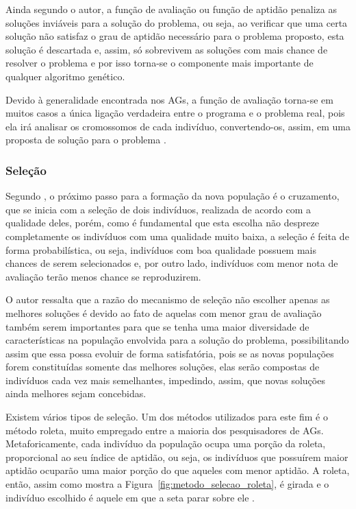 \par Ainda segundo o autor, a função de avaliação ou função de aptidão penaliza
as soluções inviáveis para a solução do problema, ou seja, ao verificar que uma
certa solução não satisfaz o grau de aptidão necessário para o problema
proposto, esta solução é descartada e, assim, só sobrevivem as soluções com mais
chance de resolver o problema e por isso torna-se o componente mais importante de qualquer algoritmo genético.

\par Devido à generalidade encontrada nos AGs, a função de avaliação
torna-se em muitos casos a única ligação verdadeira entre o programa e o
problema real, pois ela irá analisar os cromossomos de cada indivíduo,
convertendo-os, assim, em uma proposta de solução para o problema
\cite{livro_ags_ricardo_linden}.


\subsubsection{Seleção}

\par Segundo , o próximo passo
para a formação da nova população é o cruzamento, que se inicia com a seleção de
dois indivíduos, realizada de acordo com a qualidade deles, porém,
como é fundamental que esta escolha não despreze completamente os indivíduos com uma
qualidade muito baixa, a seleção é feita de forma probabilística, ou seja,
indivíduos com boa qualidade possuem mais chances de serem selecionados e, por
outro lado, indivíduos com menor nota de avaliação terão menos chance se
reproduzirem.

\par O autor ressalta que a razão do mecanismo de seleção não
escolher apenas as melhores soluções é devido ao fato de aquelas com menor
grau de avaliação também serem importantes para que se tenha uma maior diversidade de características
na população envolvida para a solução do problema, possibilitando assim
que essa possa evoluir de forma satisfatória, pois se as novas populações forem constituídas
somente das melhores soluções, elas serão compostas de indivíduos cada vez mais semelhantes,
impedindo, assim, que novas soluções ainda melhores sejam concebidas.

\par Existem vários tipos de seleção. Um dos métodos utilizados para este fim é o método
roleta, muito empregado entre a maioria dos pesquisadores de AGs. Metaforicamente, 
cada indivíduo da população ocupa uma porção da roleta, proporcional ao seu índice 
de aptidão, ou seja, os indivíduos que possuírem maior aptidão ocuparão uma maior 
porção do que aqueles com menor aptidão. A roleta, então, assim como mostra a
Figura~\ref{fig:metodo_selecao_roleta}, é girada e o indivíduo escolhido é
aquele em que a seta parar sobre ele \cite{REVISTA_MULTIDISCIPLINAR_DA_UNIESP}.


